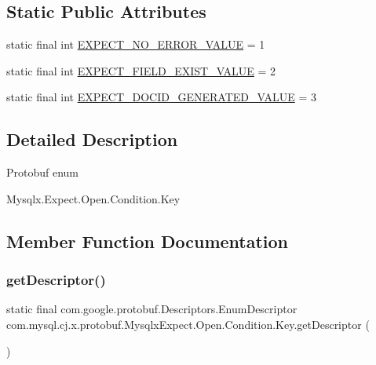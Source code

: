 \subsection*{Static Public Attributes}
\begin{DoxyCompactItemize}
\item 
static final int \mbox{\hyperlink{enumcom_1_1mysql_1_1cj_1_1x_1_1protobuf_1_1_mysqlx_expect_1_1_open_1_1_condition_1_1_key_ad7bad4a7fb752002a9fa4e15d948ffdd}{E\+X\+P\+E\+C\+T\+\_\+\+N\+O\+\_\+\+E\+R\+R\+O\+R\+\_\+\+V\+A\+L\+UE}} = 1
\item 
static final int \mbox{\hyperlink{enumcom_1_1mysql_1_1cj_1_1x_1_1protobuf_1_1_mysqlx_expect_1_1_open_1_1_condition_1_1_key_aa07fb8b80f0aee14f86e2aecb42a44e6}{E\+X\+P\+E\+C\+T\+\_\+\+F\+I\+E\+L\+D\+\_\+\+E\+X\+I\+S\+T\+\_\+\+V\+A\+L\+UE}} = 2
\item 
static final int \mbox{\hyperlink{enumcom_1_1mysql_1_1cj_1_1x_1_1protobuf_1_1_mysqlx_expect_1_1_open_1_1_condition_1_1_key_a397af0b1375555419f47569d403445e3}{E\+X\+P\+E\+C\+T\+\_\+\+D\+O\+C\+I\+D\+\_\+\+G\+E\+N\+E\+R\+A\+T\+E\+D\+\_\+\+V\+A\+L\+UE}} = 3
\end{DoxyCompactItemize}


\subsection{Detailed Description}
Protobuf enum
\begin{DoxyCode}
Mysqlx.Expect.Open.Condition.Key 
\end{DoxyCode}
 

\subsection{Member Function Documentation}
\mbox{\label{enumcom_1_1mysql_1_1cj_1_1x_1_1protobuf_1_1_mysqlx_expect_1_1_open_1_1_condition_1_1_key_abeb7c87620f891c1ff72be98727123d1}} 
\subsubsection{\texorpdfstring{get\+Descriptor()}{getDescriptor()}}
{\footnotesize\ttfamily static final com.\+google.\+protobuf.\+Descriptors.\+Enum\+Descriptor com.\+mysql.\+cj.\+x.\+protobuf.\+Mysqlx\+Expect.\+Open.\+Condition.\+Key.\+get\+Descriptor (\begin{DoxyParamCaption}{ }\end{DoxyParamCaption})\hspace{0.3cm}{\ttfamily [static]}}

